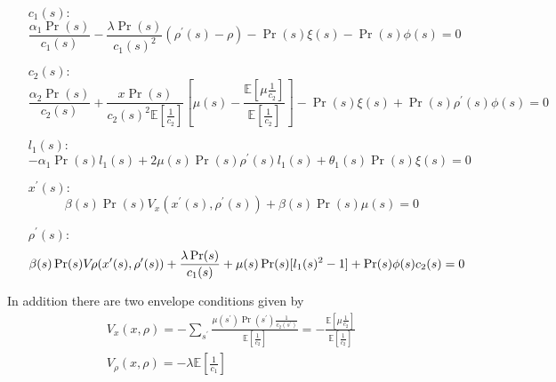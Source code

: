 \documentclass[thmsb,11pt]{article}
\begin{document}
\begin{enumerate}
\item[$c_1(s):$]
\begin{equation}
\frac{\alpha_1\Pr(s)}{c_1(s)}-\frac{\lambda \Pr(s)}{c_1(s)^2}(\rho^{\prime
}(s)-\rho)-\Pr(s)\xi(s)-\Pr(s)\phi(s) = 0  \label{eq.c1FOC}
\end{equation}

\item[$c_2(s):$]
\begin{equation}
\frac{\alpha_2 \Pr(s)}{c_2(s)} + \frac{x\Pr(s)}{c_2(s)^2\mathbb{E}[\frac1{c_2}]}%
\left[\mu(s)-\frac{\mathbb{E}[\mu\frac1{c_2}]}{\mathbb{E}[\frac1{c_2}]}%
\right]-\Pr(s)\xi(s)+\Pr(s)\rho^{\prime }(s)\phi(s)=0  \label{eq.c2FOC}
\end{equation}

\item[$l_1(s):$]
\begin{equation}
-\alpha_1\Pr(s)l_1(s)+2\mu(s)\Pr(s)\rho^{\prime
}(s)l_1(s)+\theta_1(s)\Pr(s)\xi(s)=0
\end{equation}

\item[$x^{\prime }(s):$]
\begin{equation}
\beta(s) \Pr(s)V_x(x^{\prime }(s),\rho^{\prime }(s)) + \beta(s)\Pr(s)\mu(s) = 0
\label{eq.x'FOC}
\end{equation}

\item[$\rho^{\prime }(s):$]
\begin{equation}
\beta(s) \Pr(s) V_\rho(x^{\prime }(s),\rho^{\prime }(s))+\frac{\lambda \Pr(s)}{%
c_1(s)}+\mu(s)\Pr(s)[l_1(s)^2-1]+\Pr(s)\phi(s)c_2(s) = 0  \label{eq.FOCNend}
\end{equation}
\end{enumerate}

In addition there are two envelope conditions given by
\begin{align}
V_x(x,\rho) = -\sum_{s^{\prime }}\frac{\mu(s^{\prime })\Pr(s^{\prime
})\frac1{c_2(s^{\prime })}}{\mathbb{E}[\frac1{c_2}]} = -\frac{\mathbb{E}%
[\mu\frac1{c_2}]}{\mathbb{E}[\frac1{c_2}]} \\
V_\rho(x,\rho) = -\lambda\mathbb{E}[\frac1{c_1}]  \label{eq.rho_env}
\end{align}
\end{document}

